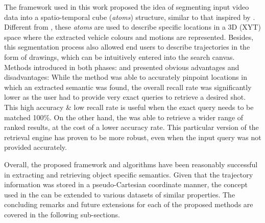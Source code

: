 The framework used in this work proposed the idea of segmenting input video data into a spatio-temporal cube (\textit{atoms}) structure, similar to that inspired by \cite{castanon2016retrieval}. Different from \cite{castanon2016retrieval}, these \textit{atoms} are used to describe specific locations in a 3D (XYT) space where the extracted vehicle colours and motions are represented. %
Besides, this segmentation process also allowed end users to describe trajectories in the form of drawings, which can be intuitively entered into the search canvas. Methods introduced in both phases: \versionOneRet and \versionTwoRet presented obvious advantages and disadvantages: While the \versionOneRet method was able to accurately pinpoint locations in which an extracted semantic was found, the overall recall rate was significantly lower as the user had to provide very exact queries to retrieve a desired shot. This high accuracy \& low recall rate is useful when the exact query needs to be matched 100\%. On the other hand, the \versionTwoRet was able to retrieve a wider range of ranked results, at the cost of a lower accuracy rate. This particular version of the retrieval engine has proven to be more robust, even when the input query was not provided accurately. 

Overall, the proposed framework and algorithms have been reasonably successful in extracting and retrieving object specific semantics. Given that the trajectory information was stored in a pseudo-Cartesian coordinate manner, the concept used in the \versionTwoRet can be extended to various datasets of similar properties. The concluding remarks and future extensions for each of the proposed methods are covered in the following sub-sections.

\vspace{1em}
